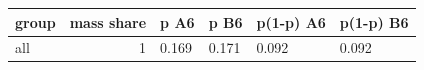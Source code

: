 \begingroup\small
\setlength{\tabcolsep}{3pt}
\renewcommand{\arraystretch}{1.04}
\begin{tabularx}{\linewidth}{XrXXXX}
\toprule
group & mass share & p A6 & p B6 & p(1-p) A6 & p(1-p) B6 \\
\midrule
all & 1 & 0.169 & 0.171 & 0.092 & 0.092 \\
\bottomrule
\end{tabularx}
\endgroup
